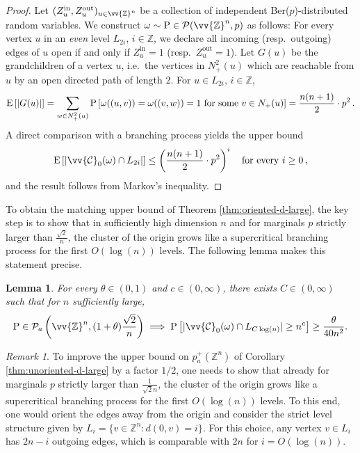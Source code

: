 \documentclass[11pt]{article}
\renewcommand{\P}{\mathrm{P}}
\newcommand{\Z}{\mathbb{Z}}
\DeclarePairedDelimiter{\abs}{\lvert}{\rvert}
\newtheorem{lemma}{Lemma}
\theoremstyle{remark}
\newtheorem{remark}{Remark}
\begin{document}
\begin{proof}
    Let $(Z^\text{in}_u, Z_u^\text{out})_{u \in \vv{\Z}^n}$ be a collection of independent Ber($p$)-distributed random variables. We construct $\omega \sim \P \in \mathcal{P}(\vv{\Z}^n, p)$ as follows: For every vertex $u$ in an \emph{even} level $L_{2i}$, $i \in \Z$, we declare all incoming (resp.\ outgoing) edges of $u$ open if and only if $Z^\text{in}_u = 1$ (resp.\ $Z^\text{out}_u = 1$). 
    Let $G(u)$ be the grandchildren of a vertex $u$, i.e.\ the vertices in $N_+^2(u)$ which are reachable from $u$ by an open directed path of length $2$. For $u \in L_{2i}$, $i\in \Z$,
    \begin{equation}
        \mathrm{E}\left[\abs{G(u)}\right] = \sum_{w\in N_+^2(u)} \P\left[ \omega((u,v))=\omega((v,w))=1\ \text{for some}\ v \in N_+(u) \right]  = \frac{n(n+1)}{2} \cdot p^2\,.
    \end{equation}
    A direct comparison with a branching process yields the upper bound 
    \begin{equation}
        \mathrm{E}\left[\abs{\vv{\mathcal{C}}_0(\omega) \cap L_{2i}}\right] \le \left(\frac{n(n+1)}{2} \cdot p^2\right)^i\quad \text{for every}\ i\ge 0\, ,
    \end{equation}
    and the result follows from Markov's inequality.
\end{proof}

To obtain the matching upper bound of Theorem \ref{thm:oriented-d-large}, the key step is to show that in sufficiently high dimension $n$ and for marginals $p$ strictly larger than $\frac{\sqrt{2}}{n}$, the cluster of the origin grows like a supercritical branching process for the first $O(\log(n))$ levels. The following lemma makes this statement precise.

\begin{lemma}\label{TightBranchingProcess}
    For every $\theta \in (0,1)$ and $c \in (0,\infty)$, there exists $C \in (0,\infty)$ such that for $n$ sufficiently large,
    \begin{equation}
        \P \in \mathcal{P}_a\left(\vv{\Z}^n,(1 + \theta)\frac{\sqrt{2}}{n} \right) \implies \P\left[\abs{\vv{\mathcal{C}}_0(\omega) \cap L_{C\log(n)}} \ge n^c \right] \ge \frac{\theta}{40 n^2}.
    \end{equation}
\end{lemma}

\begin{remark}
    To improve the upper bound on $p_a^+(\Z^n)$ of Corollary \ref{thm:unoriented-d-large} by a factor $1/2$, one needs to show that already for marginals $p$ strictly larger than $\frac{1}{\sqrt{2} n}$, the cluster of the origin grows like a supercritical branching process for the first $O(\log(n))$ levels. To this end, one would orient the edges away from the origin and consider the strict level structure given by $L_i = \{v \in \mathbb{Z}^n : d(0,v) = i\}$. For this choice, any vertex $v \in L_i$ has $2n-i$ outgoing edges, which is comparable with $2n$ for $i = O(\log(n))$.
\end{remark}
\end{document}
